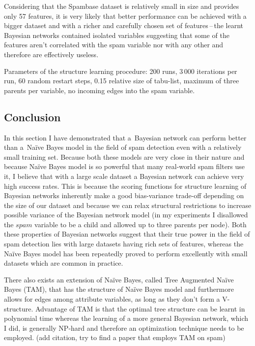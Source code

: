 \documentclass[english,cover]{fitthesis} %
\newcommand{\todo}[1]{{\color{red}#1}}
\begin{document}
Considering that the Spambase dataset is relatively small in size and provides only 57 features, it is very likely that better performance can be achieved with a bigger dataset and with a richer and carefully chosen set of features\,--\,the learnt Bayesian networks contained isolated variables suggesting that some of the features aren't correlated with the spam variable nor with any other and therefore are effectively useless.

\medskip
Parameters of the structure learning procedure: 200 runs, 3\,000 iterations per run, 60 random restart steps, 0.15 relative size of tabu-list, maximum of three parents per variable, no incoming edges into the spam variable.


\subsection{Conclusion}
In this section I have demonstrated that a~Bayesian network can perform better than a~Naïve Bayes model in the field of spam detection even with a relatively small training set. Because both these models are very close in their nature and because Naïve Bayes model is so powerful that many real-world spam filters use it, I believe that with a large scale dataset a Bayesian network can achieve very high success rates. This is because the scoring functions for structure learning of Bayesian networks inherently make a good bias-variance trade-off depending on the size of our dataset and because we can relax structural restrictions to increase possible variance of the Bayesian network model (in my experiments I disallowed the $spam$ variable to be a child and allowed up to three parents per node). Both these properties of Bayesian networks suggest that their true power in the field of spam detection lies with large datasets having rich sets of features, whereas the Naïve Bayes model has been repeatedly proved to perform excellently with small datasets which are common in practice.

\todo{There also exists an extension of Naïve Bayes, called Tree Augmented Naïve Bayes (TAM), that has the structure of Naïve Bayes model and furthermore allows for edges among attribute variables, as long as they don't form a V-structure. Advantage of TAM is that the optimal tree structure can be learnt in polynomial time whereas the learning of a more general Bayesian network, which I did, is generally NP-hard and therefore an optimization technique needs to be employed. (add citation, try to find a paper that employs TAM on spam)}
\end{document}
